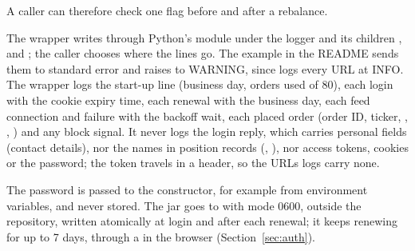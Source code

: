  A caller can therefore check one flag before and after a rebalance.

 The wrapper writes through Python's  module under the logger  and its children ,  and ; the caller chooses where the lines go. The example in the README sends them to standard error and raises  to WARNING, since  logs every URL at INFO. The wrapper logs the start-up line (business day, orders used of 80), each login with the cookie expiry time, each renewal with the business day, each feed connection and failure with the backoff wait, each placed order (order ID, ticker, , , ) and any block signal. It never logs the login reply, which carries personal fields (contact details), nor the names in position records (, ), nor access tokens, cookies or the password; the token travels in a header, so the URLs  logs carry none.

 The password is passed to the constructor, for example from environment variables, and never stored. The jar goes to \allowbreak{}\allowbreak{} with mode 0600, outside the repository, written atomically at login and after each renewal; it keeps renewing for up to 7 days, through a  in the browser (Section~\ref{sec:auth}).



